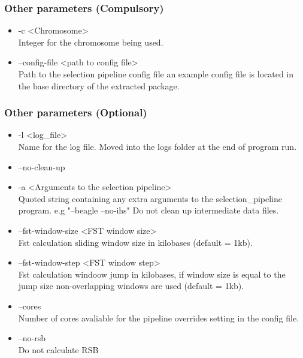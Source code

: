 \documentclass[a4paper,10pt]{article}
\begin{document}
                             \subsubsection{Other parameters (Compulsory)}
                             \begin{itemize}
                             \item -c <Chromosome>\\
                             Integer for the chromosome being used.
                             \item --config-file <path to config file>\\
                             Path to the selection pipeline config file an example config file is located in the base directory of the extracted package.
                             \end{itemize}
                             \subsubsection{Other parameters (Optional)}
                             \begin{itemize}
                             \item -l <log\_file> \\
                             Name for the log file. Moved into the logs folder at the end of program run.
                             \item --no-clean-up\\ 
                             \item -a <Arguments to the selection pipeline>\\
                             Quoted string containing any extra arguments to the selection\_pipeline program. e.g "--beagle --no-ihs"
                             Do not clean up intermediate data files.
                             \item --fst-window-size <FST window size>\\
                             Fst calculation sliding window size in kilobases (default = 1kb).
                             \item --fst-window-step <FST window step>\\
                             Fst calculation windoow jump in kilobases, if window size is equal to
                             the jump size non-overlapping windows are used (default = 1kb).
                             \item --cores \\
                             Number of cores avaliable for the pipeline overrides setting in the config file.
                             \item --no-rsb \\
                             Do not calculate RSB
                             \end{itemize}
\end{document}
